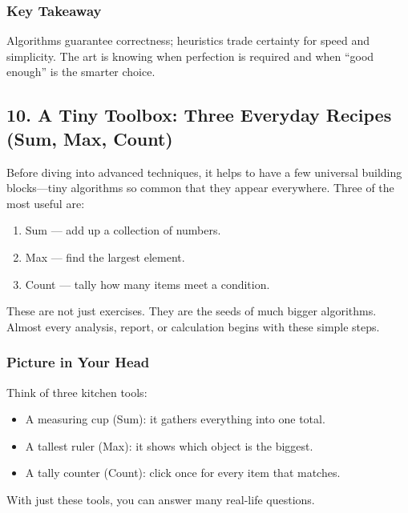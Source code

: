 \documentclass[
  letterpaper,
  DIV=11,
  numbers=noendperiod]{scrreprt}
\providecommand{\tightlist}{%
  \setlength{\itemsep}{0pt}\setlength{\parskip}{0pt}}
\begin{document}
\subsubsection{Key Takeaway}\label{key-takeaway-7}

Algorithms guarantee correctness; heuristics trade certainty for speed
and simplicity. The art is knowing when perfection is required and when
``good enough'' is the smarter choice.

\subsection{10. A Tiny Toolbox: Three Everyday Recipes (Sum, Max,
Count)}\label{a-tiny-toolbox-three-everyday-recipes-sum-max-count}

Before diving into advanced techniques, it helps to have a few universal
building blocks---tiny algorithms so common that they appear everywhere.
Three of the most useful are:

\begin{enumerate}
\def\labelenumi{\arabic{enumi}.}
\tightlist
\item
  Sum --- add up a collection of numbers.
\item
  Max --- find the largest element.
\item
  Count --- tally how many items meet a condition.
\end{enumerate}

These are not just exercises. They are the seeds of much bigger
algorithms. Almost every analysis, report, or calculation begins with
these simple steps.

\subsubsection{Picture in Your Head}\label{picture-in-your-head-9}

Think of three kitchen tools:

\begin{itemize}
\tightlist
\item
  A measuring cup (Sum): it gathers everything into one total.
\item
  A tallest ruler (Max): it shows which object is the biggest.
\item
  A tally counter (Count): click once for every item that matches.
\end{itemize}

With just these tools, you can answer many real-life questions.
\end{document}
